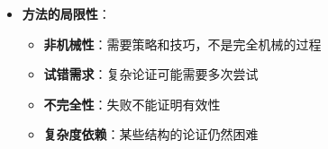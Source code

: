 \begin{center}
{{\begin{itemize}
\begin{itemize}
  \item 只需发现一行前提真结论假的情况即可证明无效
  \item 对于含多个简单陈述的论证，效率提升尤为明显
  \item 本质上是真值表方法的优化版本
  \end{itemize}
\item \textbf{方法的局限性}：
  \begin{itemize}
  \item \textbf{非机械性}：需要策略和技巧，不是完全机械的过程
  \item \textbf{试错需求}：复杂论证可能需要多次尝试
  \item \textbf{不完全性}：失败不能证明有效性
  \item \textbf{复杂度依赖}：某些结构的论证仍然困难
  \end{itemize}
\end{itemize}
}}
\end{center}